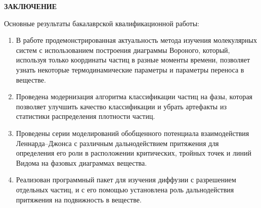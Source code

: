 \newpage
\begin{center}
\textbf{\large ЗАКЛЮЧЕНИЕ}
\end{center}


Основные результаты бакалаврской квалификационной работы:
\begin{enumerate}
    \item В работе продемонстрированная актуальность метода изучения молекулярных систем с использованием построения диаграммы Вороного, который, используя только координаты частиц в разные моменты времени, позволяет узнать некоторые термодинамические параметры и параметры переноса в веществе.
    \item Проведена модернизация алгоритма классификации частиц на фазы, которая позволяет улучшить качество классификации и убрать артефакты из статистики распределения плотности частиц.
    \item Проведены серии моделирований обобщенного потенциала взаимодействия Леннарда--Джонса с различным дальнодействием притяжения для определения его роли в расположении критических, тройных точек и линий Видома на фазовых диаграммах вещества. 
    \item Реализован программный пакет для изучения диффузии с разрешением отдельных частиц, и с его помощью установлена роль дальнодействия притяжения на подвижность в веществе. 
\end{enumerate}






